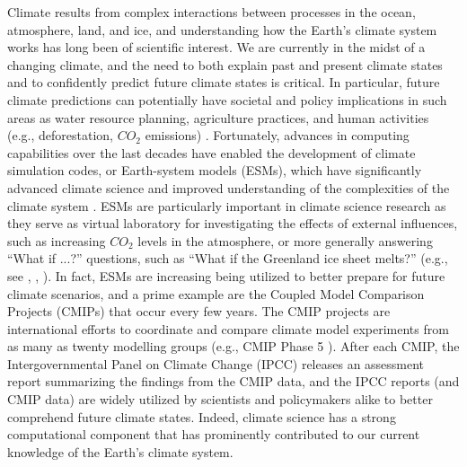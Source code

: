 Climate results from complex interactions between processes in the ocean, atmosphere, land, and ice, and understanding how the Earth's climate system works has long been of scientific interest.  We are currently in the midst of a changing climate, and the need to both explain past and present climate states and to confidently predict future climate states is critical.  In particular, future climate predictions can potentially have societal and policy implications in such areas as water resource planning, agriculture practices, and human activities (e.g., deforestation, $CO_2$ emissions) \cite{washington2005}. Fortunately, advances in computing capabilities over the last decades have enabled the development of climate simulation codes, or Earth-system models (ESMs), which have significantly advanced climate science and improved understanding of the complexities of the climate system \cite{washington2009}.  ESMs are particularly important in climate science research as they serve as virtual laboratory for investigating the effects of external influences, such as increasing $CO_2$ levels in the atmosphere, or more generally answering ``What if ...?'' questions, such as ``What if the Greenland ice sheet melts?'' (e.g., see \cite{heavens2013}, \cite{zeebe2011}, \cite{easterbrook2009}).  In fact, ESMs are increasing being utilized to better prepare for future climate scenarios, and a prime example are the Coupled Model Comparison Projects (CMIPs) that occur every few years.  The CMIP projects 
are international efforts to coordinate and compare climate model experiments from as many as twenty modelling groups (e.g., CMIP Phase 5 \citep{cmip5}).  After each CMIP, the Intergovernmental Panel on Climate Change (IPCC) \cite{ipcc-web} releases an assessment report summarizing the findings from the CMIP data, and the IPCC reports (and CMIP data)
are widely utilized by scientists and policymakers alike to better comprehend future climate states. Indeed, climate science has a strong computational component that has prominently contributed to our current knowledge of the Earth's climate system.


